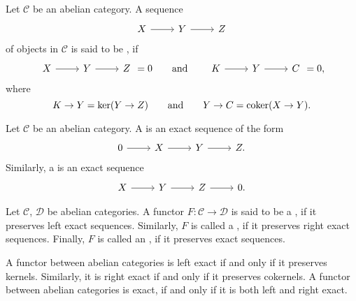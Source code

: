 \begin{definition}[Exactness]
	Let $\mathcal{C}$ be an abelian category. A sequence
	\begin{equation*}
		\begin{tikzcd}
			X \arrow[r] & Y \arrow[r] & Z
		\end{tikzcd}
	\end{equation*}
	\noindent of objects in $\mathcal{C}$ is said to be , if 
	\begin{equation*}
		\begin{tikzcd}
			X \arrow[r] & Y \arrow[r] & Z 
		\end{tikzcd} = 0 \qquad \text{and} \qquad
		\begin{tikzcd}
			K \arrow[r] & Y \arrow[r] & C
		\end{tikzcd} = 0,
	\end{equation*}
	\noindent where
	\begin{equation*}
		K \to Y = \ker(Y \to Z)
		\qquad \text{and} \qquad
		Y \to C = \operatorname{coker}(X \to Y).
	\end{equation*}
\end{definition}

\begin{definition}
	Let $\mathcal{C}$ be an abelian category. A  is an exact sequence of the form
	\begin{equation*}
		\begin{tikzcd}
			0 \arrow[r] & X \arrow[r] & Y \arrow[r] & Z.
		\end{tikzcd}
	\end{equation*}
	Similarly, a  is an exact sequence
	\begin{equation*}
		\begin{tikzcd}
			X \arrow[r] & Y \arrow[r] & Z \arrow[r] & 0.
		\end{tikzcd}
	\end{equation*}
\end{definition}

\begin{definition}
	Let $\mathcal{C}$, $\mathcal{D}$ be abelian categories. A functor $F : \mathcal{C} \to \mathcal{D}$ is said to be a , if it preserves left exact sequences. Similarly, $F$ is called a , if it preserves right exact sequences. Finally, $F$ is called an , if it preserves exact sequences.
\end{definition}

\begin{remark}
	A functor between abelian categories is left exact if and only if it preserves kernels. Similarly, it is right exact if and only if it preserves cokernels. A functor between abelian categories is exact, if and only if it is both left and right exact.
\end{remark}
